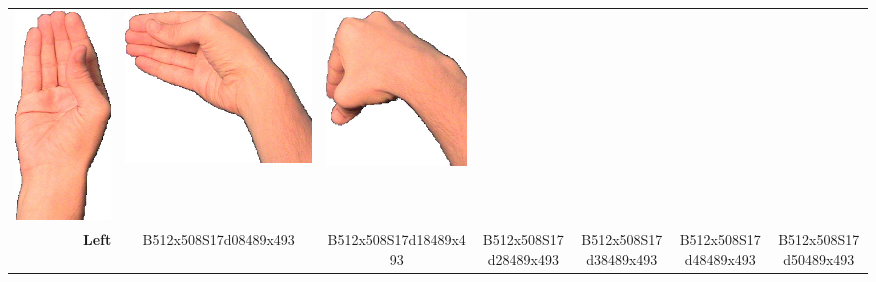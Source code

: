 \documentclass{article}
\begin{document}
\begin{center}
\begin{tabular}{r*{6}{c}}
\includegraphics[scale=0.1]{images/05-18-4.jpg}&
\includegraphics[scale=0.1]{images/05-18-5.jpg}&
\includegraphics[scale=0.1]{images/05-18-6.jpg}\\
\textbf{Left}&
B512x508S17d08489x493&
B512x508S17d18489x493&
B512x508S17d28489x493&
B512x508S17d38489x493&
B512x508S17d48489x493&
B512x508S17d50489x493\\
\end{tabular}
\end{center}
\end{document}
